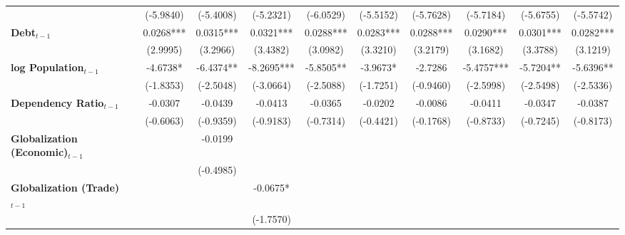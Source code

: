 \begin{center}
\begin{tabular}{lccccccccc}
\textbf{ }                         &   (-5.9840)    &    (-5.4008)     &    (-5.2321)     &    (-6.0529)     &    (-5.5152)     &    (-5.7628)     &    (-5.7184)     &    (-5.6755)     &    (-5.5742)      \\
\textbf{Debt$_{t-1}$}                &   0.0268***    &    0.0315***     &    0.0321***     &    0.0288***     &    0.0283***     &    0.0288***     &    0.0290***     &    0.0301***     &    0.0282***      \\
\textbf{ }                         &    (2.9995)    &     (3.2966)     &     (3.4382)     &     (3.0982)     &     (3.3210)     &     (3.2179)     &     (3.1682)     &     (3.3788)     &     (3.1219)      \\
\textbf{log Population$_{t-1}$}      &    -4.6738*    &    -6.4374**     &    -8.2695***    &    -5.8505**     &     -3.9673*     &     -2.7286      &    -5.4757***    &    -5.7204**     &    -5.6396**      \\
\textbf{ }                         &   (-1.8353)    &    (-2.5048)     &    (-3.0664)     &    (-2.5088)     &    (-1.7251)     &    (-0.9460)     &    (-2.5998)     &    (-2.5498)     &    (-2.5336)      \\
\textbf{Dependency Ratio$_{t-1}$}   &    -0.0307     &     -0.0439      &     -0.0413      &     -0.0365      &     -0.0202      &     -0.0086      &     -0.0411      &     -0.0347      &     -0.0387       \\
\textbf{ }                         &   (-0.6063)    &    (-0.9359)     &    (-0.9183)     &    (-0.7314)     &    (-0.4421)     &    (-0.1768)     &    (-0.8733)     &    (-0.7245)     &    (-0.8173)      \\
\textbf{Globalization (Economic)$_{t-1}$}             &                &     -0.0199      &                  &                  &                  &                  &                  &                  &                   \\
\textbf{ }                         &                &    (-0.4985)     &                  &                  &                  &                  &                  &                  &                   \\
\textbf{Globalization (Trade)$_{t-1}$}             &                &                  &     -0.0675*     &                  &                  &                  &                  &                  &                   \\
\textbf{ }                         &                &                  &    (-1.7570)     &                  &                  &                  &                  &                  &                   \\

\end{tabular}
\end{center}
